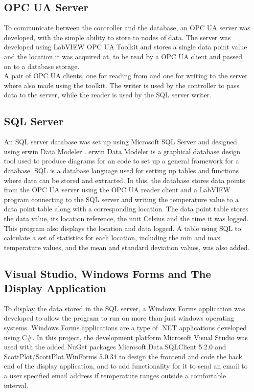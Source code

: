 \documentclass[11pt, A4paper, english]{article}
\numberwithin{equation}{section}
\begin{document}
\begin{multicols}{2}
		\subsection{OPC UA Server}
To communicate between the controller and the database, an OPC UA server was developed, with the simple ability to store to nodes of data. The server was developed using LabVIEW OPC UA Toolkit and stores a single data point value and the location it was acquired at, to be read by a OPC UA client and passed on to a database storage. \\
A pair of OPC UA clients, one for reading from and one for writing to the server where also made using the toolkit. The writer is used by the controller to pass data to the server, while the reader is used by the SQL server writer.
		
		\subsection{SQL Server}
An SQL server database was set up using Microsoft SQL Server \cite{SQL} and designed using erwin Data Modeler \cite{erwin}. erwin Data Modeler is a graphical database design tool used to produce diagrams for an code to set up a general framework for a database. SQL is a database language used for setting up tables and functions where data can be stored and extracted. In this, the database stores data points from the OPC UA server using the OPC UA reader client and a LabVIEW program connecting to the SQL server and writing the temperature value to a data point table along with a corresponding location. The data point table stores the data value, its location reference, the unit Celsius and the time it was logged. This program also displays the location and data logged. A table using SQL to calculate a set of statistics for each location, including the min and max temperature values, and the mean and standard deviation values, was also added.
		
		\subsection{Visual Studio, Windows Forms and The Display Application}
To display the data stored in the SQL server, a Windows Forms application was developed to allow the program to run on more than just windows operating systems. Windows Forms applications are a type of .NET applications developed using C\#. In this project, the development platform Microsoft Visual Studio \cite{VS} was used with the added NuGet packages Microsoft.Data.SQLClient 5.2.0 \cite{SQLClient} and ScottPlot/ScottPlot.WinForms 5.0.34 \cite{ScottPlott} to design the frontend and code the back end of the display application, and to add functionality for it to send an email to a user specified email address if temperature ranges outside a comfortable interval.


\end{multicols}
\end{document}
